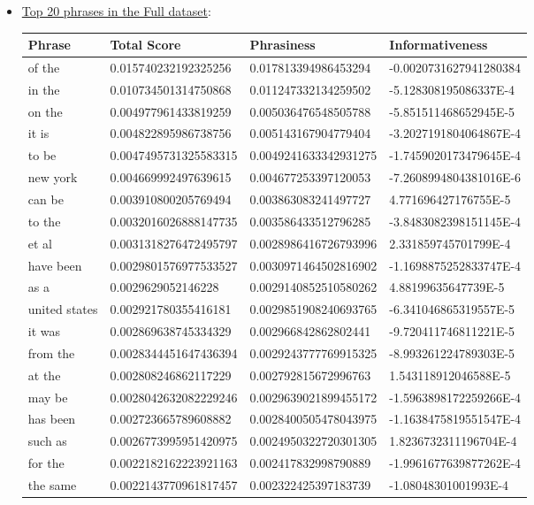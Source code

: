 \documentclass[paper=a4, fontsize=11pt]{scrartcl} %
\numberwithin{equation}{section} %
\numberwithin{figure}{section} %
\numberwithin{table}{section} %
\begin{document}
\begin{itemize}
\pagebreak

\item \underline{Top 20 phrases in the Full dataset}: \\
\begin{tabular}{| l | l | l | l |}
\hline
\textbf{Phrase} & \textbf{Total Score} & \textbf{Phrasiness} & \textbf{Informativeness} \\
\hline
of the &  0.015740232192325256 &    0.017813394986453294 &    -0.0020731627941280384 \\
in the &  0.010734501314750868 &    0.011247332134259502 &    -5.128308195086337E-4 \\
on the &  0.004977961433819259 &    0.005036476548505788 &    -5.851511468652945E-5 \\
it is &   0.004822895986738756 &    0.005143167904779404 &    -3.2027191804064867E-4 \\
to be &   0.0047495731325583315 &   0.0049241633342931275 &   -1.7459020173479645E-4 \\
new york &        0.004669992497639615 &    0.004677253397120053 &    -7.2608994804381016E-6 \\
can be &  0.003910800205769494 &    0.003863083241497727 &    4.771696427176755E-5 \\
to the &  0.0032016026888147735 &   0.003586433512796285 &    -3.8483082398151145E-4 \\
et al &   0.0031318276472495797 &   0.0028986416726793996 &   2.331859745701799E-4 \\
have been &       0.0029801576977533527 &   0.0030971464502816902 &   -1.1698875252833747E-4 \\
as a &    0.0029629052146228 &      0.0029140852510580262 &   4.88199635647739E-5 \\
united states &   0.002921780355416181 &    0.0029851908240693765 &   -6.341046865319557E-5 \\
it was &  0.002869638745334329 &    0.002966842862802441 &    -9.720411746811221E-5 \\
from the &        0.0028344451647436394 &   0.0029243777769915325 &   -8.993261224789303E-5 \\
at the &  0.002808246862117229 &    0.002792815672996763 &    1.543118912046588E-5 \\
may be &  0.0028042632082229246 &   0.0029639021899455172 &   -1.5963898172259266E-4 \\
has been &        0.002723665789608882 &    0.0028400505478043975 &   -1.1638475819551547E-4 \\
such as & 0.0026773995951420975 &   0.0024950322720301305 &   1.8236732311196704E-4 \\
for the & 0.0022182162223921163 &   0.002417832998790889 &    -1.9961677639877262E-4 \\
the same &        0.0022143770961817457 &   0.002322425397183739 &    -1.08048301001993E-4 \\
\hline
\end{tabular}
\end{itemize}
\end{document}
